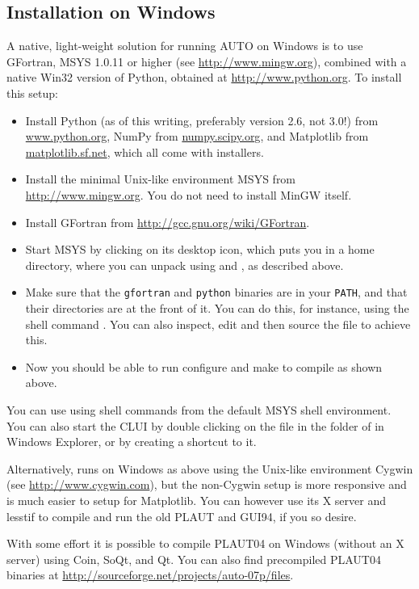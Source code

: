 \documentclass[12pt]{report}
\begin{document}
\subsection{Installation on Windows}
A native, light-weight solution for running AUTO on Windows is
to use GFortran, MSYS 1.0.11 or higher (see \url{http://www.mingw.org}),
combined with a native Win32 version of Python,
obtained at \url{http://www.python.org}. To install this setup:
\begin{itemize}
\item
Install Python (as of this writing, preferably version 2.6, not 3.0!)
from \url{www.python.org}, NumPy from \url{numpy.scipy.org},
and Matplotlib from \url{matplotlib.sf.net}, which all come
with installers.
\item
Install the minimal Unix-like environment MSYS from
\url{http://www.mingw.org}. You do not need to install MinGW
itself.
\item
Install GFortran from \url{http://gcc.gnu.org/wiki/GFortran}.
\item
Start MSYS by clicking on its desktop icon, which
puts you in a home directory, where you can unpack
\AUTO using  and , as described above.
\item
Make sure that the {\tt gfortran} and {\tt python} binaries
are in your {\tt PATH}, and that their directories are at the front of it.
You can do this, for instance, using the shell command
.
You can also inspect, edit and then source the file
 to achieve this.
\item
Now you should be able to run configure and make to compile \AUTO
as shown above.
\end{itemize}

You can use \AUTO using shell commands from the default MSYS shell
environment. You can also start the CLUI by double clicking on the file
 in the  folder of \AUTO in Windows Explorer,
or by creating a shortcut to it.

Alternatively, \AUTO runs on Windows as above using the Unix-like
environment Cygwin (see \url{http://www.cygwin.com}), but the
non-Cygwin setup is more responsive and is much easier to setup for
Matplotlib. You can however use its X server and lesstif to compile
and run the old {\cal PLAUT} and GUI94, if you so desire.

With some effort it is possible to compile {\cal PLAUT04}
on Windows (without an X server) using Coin, SoQt, and Qt. You can
also find precompiled {\cal PLAUT04} binaries at
\url{http://sourceforge.net/projects/auto-07p/files}.
\end{document}
